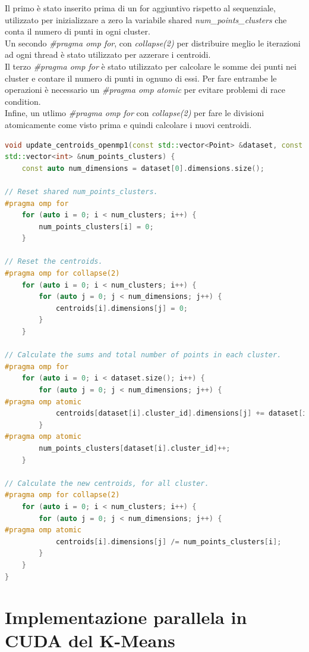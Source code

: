\documentclass[10pt,twocolumn,letterpaper]{article}
\begin{document}
Il primo è stato inserito prima di un for aggiuntivo rispetto al sequenziale, utilizzato per inizializzare a zero la variabile shared \textit{num\_points\_clusters} che conta il numero di punti in ogni cluster.\\
Un secondo \textit{\#pragma omp for}, con \textit{collapse(2)} per distribuire meglio le iterazioni ad ogni thread è stato utilizzato per azzerare i centroidi.\\
Il terzo \textit{\#pragma omp for} è stato utilizzato per calcolare le somme dei punti nei cluster e contare il numero di punti in ognuno di essi. Per fare entrambe le operazioni è necessario un \textit{\#pragma omp atomic} per evitare problemi di race condition.\\
Infine, un utlimo \textit{\#pragma omp for} con \textit{collapse(2)} per fare le divisioni atomicamente come visto prima e quindi calcolare i nuovi centroidi.
\begin{lstlisting}[language=c++, caption=Aggionamento Open-MP, label=code:OMPupdate]
void update_centroids_openmp1(const std::vector<Point> &dataset, const int num_clusters, std::vector<Point> &centroids,
std::vector<int> &num_points_clusters) {
	const auto num_dimensions = dataset[0].dimensions.size();

// Reset shared num_points_clusters.
#pragma omp for
	for (auto i = 0; i < num_clusters; i++) {
		num_points_clusters[i] = 0;
	}

// Reset the centroids.
#pragma omp for collapse(2)
	for (auto i = 0; i < num_clusters; i++) {
		for (auto j = 0; j < num_dimensions; j++) {
			centroids[i].dimensions[j] = 0;
		}
	}

// Calculate the sums and total number of points in each cluster.
#pragma omp for
	for (auto i = 0; i < dataset.size(); i++) {
		for (auto j = 0; j < num_dimensions; j++) {
#pragma omp atomic
			centroids[dataset[i].cluster_id].dimensions[j] += dataset[i].dimensions[j];
		}
#pragma omp atomic
		num_points_clusters[dataset[i].cluster_id]++;
	}

// Calculate the new centroids, for all cluster.
#pragma omp for collapse(2)
	for (auto i = 0; i < num_clusters; i++) {
		for (auto j = 0; j < num_dimensions; j++) {
#pragma omp atomic
			centroids[i].dimensions[j] /= num_points_clusters[i];
		}
	}
}
\end{lstlisting}

\section{Implementazione parallela in CUDA del K-Means}
\end{document}
